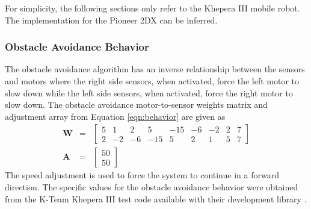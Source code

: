      For simplicity, the following sections only refer to the Khepera III
        mobile robot.
      The implementation for the Pioneer 2DX can be inferred.

      \subsubsection{Obstacle Avoidance Behavior}
        The obstacle avoidance algorithm has an inverse relationship between the 
          sensors and motors where the right side sensors, when activated, force 
          the left motor to slow down while the left side sensors, when 
          activated, force the right motor to slow down.
        The obstacle avoidance motor-to-sensor weights matrix and adjustment 
          array from Equation \ref{eqn:behavior} are given as
        \begin{eqnarray*}
          \mathbf{W}&=&\left[
          \begin{array}{ccccccccc}
            5 & 1 & 2 &  5 &-15 &-6 &-2 &2 &7\\
            2 &-2 &-6 &-15 &  5 & 2 & 1 &5 &7
          \end{array}
          \right]\\
          \mathbf{A} &=& \left[
          \begin{array}{c}
            50 \\
            50
          \end{array}
          \right]
        \end{eqnarray*}
        The speed adjustment is used to force the system to continue in a 
          forward direction.
        The specific values for the obstacle avoidance behavior were obtained 
          from the K-Team Khepera III test code available with their development 
          library \cite{kteam}.

